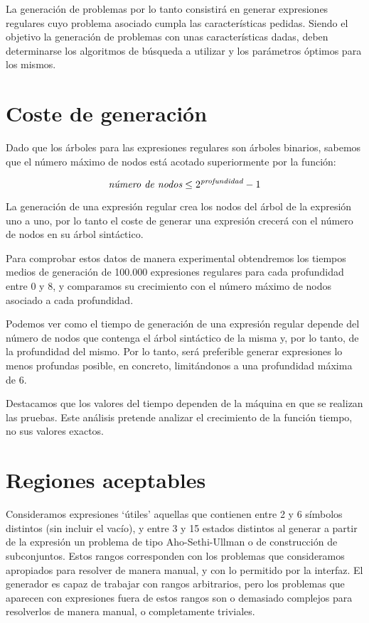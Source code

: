 La generación de problemas por lo tanto consistirá en generar expresiones regulares cuyo problema asociado cumpla las características pedidas.
Siendo el objetivo la generación de problemas con unas características dadas, deben determinarse los algoritmos de búsqueda a utilizar y los parámetros óptimos para los mismos.

\section{Coste de generación}

Dado que los árboles para las expresiones regulares son árboles binarios, sabemos que el número máximo de nodos está acotado superiormente por la función:

\begin{equation*}
\text{\em número de nodos} \leq 2^\text{\em profundidad} - 1
\end{equation*}

La generación de una expresión regular crea los nodos del árbol de la expresión uno a uno, por lo tanto el coste de generar una expresión crecerá con el número de nodos en su árbol sintáctico.

Para comprobar estos datos de manera experimental obtendremos los tiempos medios de generación de 100.000 expresiones regulares para cada profundidad entre 0 y 8, y comparamos su crecimiento con el número máximo de nodos asociado a cada profundidad.


Podemos ver como el tiempo de generación de una expresión regular depende del número de nodos que contenga el árbol sintáctico de la misma y, por lo tanto, de la profundidad del mismo.
Por lo tanto, será preferible generar expresiones lo menos profundas posible, en concreto, limitándonos a una profundidad máxima de 6.

Destacamos que los valores del tiempo dependen de la máquina en que se realizan las pruebas.
Este análisis pretende analizar el crecimiento de la función tiempo, no sus valores exactos.

\section{Regiones aceptables}

Consideramos expresiones `útiles' aquellas que contienen entre 2 y 6 símbolos distintos (sin incluir el vacío), y entre 3 y 15 estados distintos al generar a partir de la expresión un problema de tipo Aho-Sethi-Ullman o de construcción de subconjuntos.
Estos rangos corresponden con los problemas que consideramos apropiados para resolver de manera manual, y con lo permitido por la interfaz.
El generador es capaz de trabajar con rangos arbitrarios, pero los problemas que aparecen con expresiones fuera de estos rangos son o demasiado complejos para resolverlos de manera manual, o completamente triviales.

